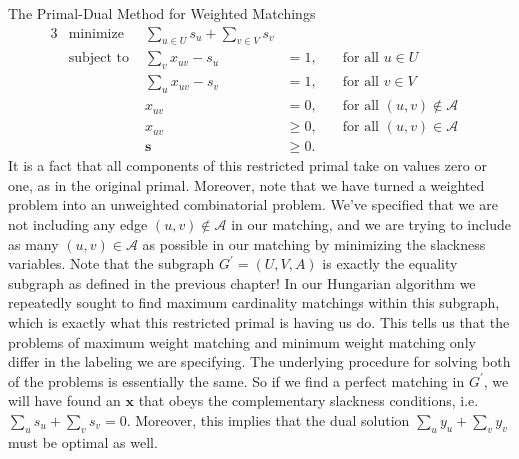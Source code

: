 \begin{section}{The Primal-Dual Method for Weighted Matchings}
	\begin{alignat}{3}
		& \text{minimize } & \sum_{u\in U} s_u + \sum_{v\in V} s_v & \\
		& \text{subject to } & \sum_v x_{uv} - s_u & = 1, & \quad \text{for all } u\in U& \\
				     && \sum_u x_{uv} - s_v & = 1, & \quad \text{for all } v\in V& \\
				     && x_{uv} & = 0, & \quad \text{for all }(u,v)\notin 
				     \mathcal{A} \\
				     && x_{uv} & \geq 0, & \quad \text{for all } (u,v)\in 
				     \mathcal{A} \\
				     && \mathbf{s} & \geq 0.
	\end{alignat}
	It is a fact that all components of this restricted primal take on values zero or one, as 
	in the original primal. Moreover, note that we have turned a weighted problem into an 
	unweighted combinatorial problem. We've specified that we are not including any edge 
	$(u,v)\notin \mathcal{A}$ in our matching, and we are trying to include as many 
	$(u,v)\in \mathcal{A}$ as possible 
	in our matching by minimizing the slackness variables. Note that the subgraph $G^{'} = (U,V,A)$ 
	is exactly the equality subgraph as defined in the previous chapter! In our Hungarian algorithm 
	we repeatedly sought to find maximum cardinality matchings within this subgraph, which is 
	exactly what this restricted primal is having us do. This tells us that the problems of maximum 
	weight matching and minimum weight matching only differ in the labeling we are specifying. The 
	underlying procedure for solving both of the problems is essentially the same. So if we find a 
	perfect matching in $G^{'}$, we will have found an $\mathbf{x}$ that obeys the complementary 
	slackness conditions, i.e. $\sum_u s_u + \sum_v s_v = 0$. Moreover, this implies that the 
	dual solution $\sum_u y_u + \sum_v y_v$ must be optimal as well.


\end{section}
